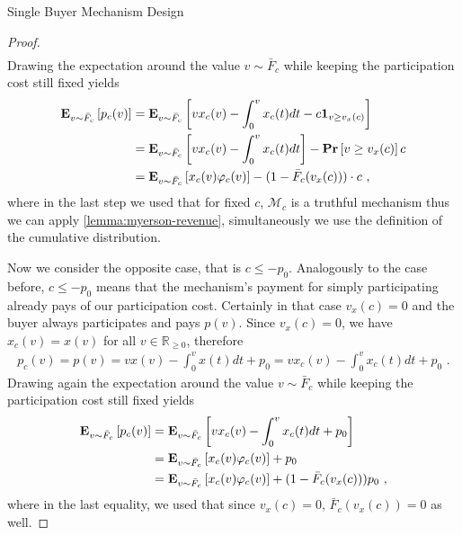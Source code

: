 \documentclass[11pt,a4paper]{article}
\newcommand{\RR}{\ensuremath{\mathbb{R}}}
\renewcommand{\Pr}[1]{\mbox{\rm\bf Pr}\left[#1\right]}
\newcommand{\Ex}[2][]{\mbox{\rm\bf E}_{#1}\left[#2\right]}
\newcommand{\1}[1]{\mbox{\rm\bf 1}_{#1}}
\newcommand{\eqdot}{\text{ .}}
\newcommand{\eqcomma}{\text{ ,}}
\begin{document}
\begin{section}{Single Buyer Mechanism Design}
\begin{proof}
\begin{align*}
     \end{align*}
     Drawing the expectation around the value $v \sim \bar{F}_c$ while keeping the participation cost still fixed yields
     \begin{equation}
         \label{eq:expected-revenue-first-case}
         \begin{aligned}
             \Ex[v \sim \bar{F}_c]{p_c(v)} & = \Ex[v \sim \bar{F}_c]{v x_c(v) - \int_0^v x_c(t) dt - c \1{v \geq v_x(c)}}            \\
                                           & = \Ex[v \sim \bar{F}_c]{v x_c(v) - \int_0^v x_c(t) dt} - \Pr{v \geq v_x(c)}c            \\
                                           & = \Ex[v \sim \bar{F}_c]{x_c(v) \varphi_c(v)} - (1 - \bar{F}_c(v_x(c))) \cdot c \eqcomma
         \end{aligned}
     \end{equation}
     where in the last step we used that for fixed $c$, $\mathcal{M}_c$ is a truthful mechanism thus we can apply \cref{lemma:myerson-revenue}, simultaneously we use the definition of the cumulative distribution.

     Now we consider the opposite case, that is $c \leq -p_0$.
     Analogously to the case before, $c \leq -p_0$ means that the mechanism's payment for simply participating already pays of our participation cost.
     Certainly in that case $v_x(c) = 0$ and the buyer always participates and pays $p(v)$.
     Since $v_x(c) = 0$, we have $x_c(v) = x(v)$ for all $v \in \RR_{\geq 0}$, therefore
     \begin{align*}
         p_c(v) = p(v) = v x(v) - \int_0^v x(t)dt + p_0 = v x_c(v) - \int_0^v x_c(t)dt + p_0 \eqdot
     \end{align*}
     Drawing again the expectation around the value $v \sim \bar{F}_c$ while keeping the participation cost still fixed yields
     \begin{equation}
         \label{eq:expected-revenue-second-case}
         \begin{aligned}
             \Ex[v \sim \bar{F}_c]{p_c(v)} & = \Ex[v \sim \bar{F}_c]{v x_c(v) - \int_0^v x_c(t)dt + p_0}                           \\
                                           & = \Ex[v \sim \bar{F}_c]{x_c(v) \varphi_c(v)} + p_0                                    \\
                                           & = \Ex[v \sim \bar{F}_c]{x_c(v) \varphi_c(v)} + (1 - \bar{F}_{c}(v_x(c))) p_0 \eqcomma
         \end{aligned}
     \end{equation}
     where in the last equality, we used that since $v_x(c) = 0$, $\bar{F}_{c}(v_x(c)) = 0$ as well.


\end{proof}
\end{section}
\end{document}
